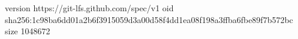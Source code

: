 version https://git-lfs.github.com/spec/v1
oid sha256:1c98ba6dd01a2b6f3915059d3a00d58f4dd1ea08f198a3ffba6fbe89f7b572bc
size 1048672
